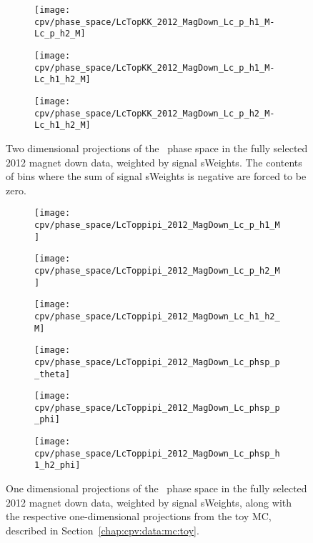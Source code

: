 \begin{figure}
  \begin{subfigure}{0.5\textwidth}
    \texttt{[image: cpv/phase\_space/LcTopKK\_2012\_MagDown\_Lc\_p\_h1\_M-Lc\_p\_h2\_M]}
    \label{fig:cpv:phsp:data:pKK:msqphm_msqphp}
  \end{subfigure}
  \begin{subfigure}{0.5\textwidth}
    \texttt{[image: cpv/phase\_space/LcTopKK\_2012\_MagDown\_Lc\_p\_h1\_M-Lc\_h1\_h2\_M]}
    \label{fig:cpv:phsp:data:pKK:msqphp_msqhh}
  \end{subfigure}
  \begin{subfigure}{0.5\textwidth}
    \texttt{[image: cpv/phase\_space/LcTopKK\_2012\_MagDown\_Lc\_p\_h2\_M-Lc\_h1\_h2\_M]}
    \label{fig:cpv:phsp:data:pKK:msqpp_msqhh}
  \end{subfigure}
  \caption{%
    Two dimensional projections of the \LcTopKK\ phase space in the fully 
    selected 2012 magnet down data, weighted by signal sWeights.
    The contents of bins where the sum of signal sWeights is negative are 
    forced to be zero.
  }
  \label{fig:cpv:phsp:data_2D:pKK}
\end{figure}

\begin{figure}
  \centering
  \begin{subfigure}{0.4\textwidth}
    \texttt{[image: cpv/phase\_space/LcToppipi\_2012\_MagDown\_Lc\_p\_h1\_M]}
    \label{fig:cpv:phsp:data:ppipi:msqphm}
  \end{subfigure}
  \begin{subfigure}{0.4\textwidth}
    \texttt{[image: cpv/phase\_space/LcToppipi\_2012\_MagDown\_Lc\_p\_h2\_M]}
    \label{fig:cpv:phsp:data:ppipi:msqphp}
  \end{subfigure}
  \begin{subfigure}{0.4\textwidth}
    \texttt{[image: cpv/phase\_space/LcToppipi\_2012\_MagDown\_Lc\_h1\_h2\_M]}
    \label{fig:cpv:phsp:data:ppipi:msqhh}
  \end{subfigure}
  \begin{subfigure}{0.4\textwidth}
    \texttt{[image: cpv/phase\_space/LcToppipi\_2012\_MagDown\_Lc\_phsp\_p\_theta]}
    \label{fig:cpv:phsp:data:ppipi:proton_theta}
  \end{subfigure}
  \begin{subfigure}{0.4\textwidth}
    \texttt{[image: cpv/phase\_space/LcToppipi\_2012\_MagDown\_Lc\_phsp\_p\_phi]}
    \label{fig:cpv:phsp:data:ppipi:proton_phi}
  \end{subfigure}
  \begin{subfigure}{0.4\textwidth}
    \texttt{[image: cpv/phase\_space/LcToppipi\_2012\_MagDown\_Lc\_phsp\_h1\_h2\_phi]}
    \label{fig:cpv:phsp:data:ppipi:h1_h2_phi}
  \end{subfigure}
  \caption{%
    One dimensional projections of the \LcToppipi\ phase space in the fully 
    selected 2012 magnet down data, weighted by signal sWeights, along with the 
    respective one-dimensional projections from the toy \ac{MC}, described in 
    Section~\ref{chap:cpv:data:mc:toy}.
  }
  \label{fig:cpv:phsp:data_1D:ppipi}
\end{figure}


